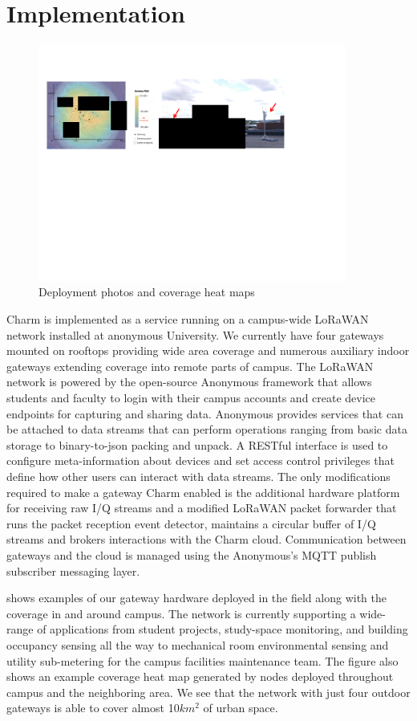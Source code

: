 \section{Implementation}
\label{sec:implementation}

\begin{figure}
    \centering
    \includegraphics[width=0.9\textwidth]{figures/deployment.pdf}
    \caption{Deployment photos and coverage heat maps}
    \label{fig:deployment}
\end{figure}

Charm is implemented as a service running on a campus-wide LoRaWAN network installed at anonymous University.  We currently have four gateways mounted on rooftops providing wide area coverage and numerous auxiliary indoor gateways extending coverage into remote parts of campus.  The LoRaWAN network is powered by the open-source Anonymous framework that allows students and faculty to login with their campus accounts and create device endpoints for capturing and sharing data.  Anonymous provides services that can be attached to data streams that can perform operations ranging from basic data storage to binary-to-json packing and unpack. A RESTful interface is used to configure meta-information about devices and set access control privileges that define how other users can interact with data streams.  The only modifications required to make a gateway Charm enabled is the additional hardware platform for receiving raw I/Q streams and a modified LoRaWAN packet forwarder that runs the packet reception event detector, maintains a circular buffer of I/Q streams and brokers interactions with the Charm cloud.  Communication between gateways and the cloud is managed using the Anonymous's MQTT publish subscriber messaging layer.

  shows examples of our gateway hardware deployed in the field along with the coverage in and around campus.  The network is currently supporting a wide-range of applications from student projects, study-space monitoring, and building occupancy sensing all the way to mechanical room environmental sensing and utility sub-metering for the campus facilities maintenance team.  The figure also shows an example coverage heat map generated by nodes deployed throughout campus and the neighboring area.  We see that the network with just four outdoor gateways is able to cover almost 10$km^2$ of urban space.

